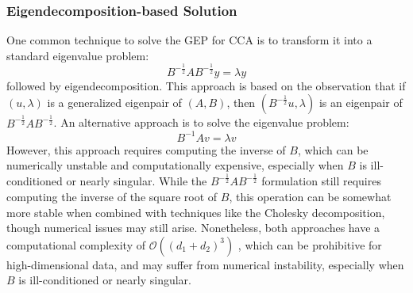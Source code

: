 \subsubsection{Eigendecomposition-based Solution}
One common technique to solve the GEP for CCA is to transform it into a standard eigenvalue problem:
\begin{equation}
B^{-\frac{1}{2}} A B^{-\frac{1}{2}} y = \lambda y
\end{equation}
followed by eigendecomposition. This approach is based on the observation that if $(u, \lambda)$ is a generalized eigenpair of $(A, B)$, then $(B^{-\frac{1}{2}}u, \lambda)$ is an eigenpair of $B^{-\frac{1}{2}} A B^{-\frac{1}{2}}$.
An alternative approach is to solve the eigenvalue problem:
\begin{equation}
B^{-1} A v = \lambda v
\end{equation}
However, this approach requires computing the inverse of $B$, which can be numerically unstable and computationally expensive, especially when $B$ is ill-conditioned or nearly singular. While the $B^{-\frac{1}{2}} A B^{-\frac{1}{2}}$ formulation still requires computing the inverse of the square root of $B$, this operation can be somewhat more stable when combined with techniques like the Cholesky decomposition, though numerical issues may still arise.
Nonetheless, both approaches have a computational complexity of $\mathcal{O}((d_1+d_2)^3)$ \citep{golub2013matrix}, which can be prohibitive for high-dimensional data, and may suffer from numerical instability, especially when $B$ is ill-conditioned or nearly singular.

